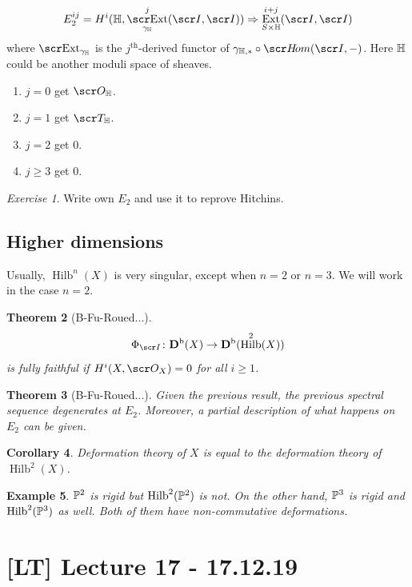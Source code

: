 \documentclass[A4paper, british]{amsart}
\theoremstyle{darkgreentheorem}
\newtheorem{thm}{Theorem}[section]
\newtheorem{cor}[thm]{Corollary}
\theoremstyle{darkbluedefinition}
\theoremstyle{darkredexample}
\newtheorem{exa}[thm]{Example}
\theoremstyle{remark}
\newtheorem{exe}[thm]{Exercise}
\DeclareMathOperator{\Ext}{Ext}
\DeclareMathOperator{\ext}{\E xt}
\DeclareMathOperator{\Hilb}{Hilb}
\newcommand{\1}{\mathbbm{1}}
\begin{document}
\[ E_{2}^{ij}=H^{i}(\bbH,\ext_{\gamma_{\bbH}}^{j}(\I,\I))\Rightarrow \Ext_{S\times \bbH}^{i+j}(\I,\I) \]
where $\ext_{\gamma_{\bbH}}$ is the $j^{\mathrm{th}}$-derived functor of $\gamma_{\bbH,*}\circ \hom(\I,-)$.
Here $\bbH$ could be another moduli space of sheaves.
\begin{enumerate}
    \item $j=0$ get $\O_{\bbH}$.
    \item $j=1$ get $\sT_{\bbH}$.
    \item $j=2$ get $0$.
    \item $j\geqslant 3$ get $0$.
\end{enumerate}

\begin{exe}
    Write own $E_{2}$ and use it to reprove Hitchins.
\end{exe}

\subsection{Higher dimensions}

Usually, $\Hilb^{n}(X)$ is very singular, except when $n=2$ or $n=3$.
We will work in the case $n=2$.

\begin{thm}[B-Fu-Roued...]
    \[ \Phi_{\I}\colon \Db(X)\to \Db(\Hilb^{2}(X)) \]
    is fully faithful if $H^{i}(X,\O_{X})=0$ for all $i\geqslant 1$.
\end{thm}

\begin{thm}[B-Fu-Roued...]
    Given the previous result, the previous spectral sequence degenerates at $E_{2}$.
    Moreover, a partial description of what happens on $E_{2}$ can be given.
\end{thm}

\begin{cor}
    Deformation theory of $X$ is equal to the deformation theory of $\Hilb^{2}(X)$.
\end{cor}

\begin{exa}
    $\P^{2}$ is rigid but $\Hilb^{2}(\P^{2})$ is not.
    On the other hand, $\P^{3}$ is rigid and $\Hilb^{2}(\P^{3})$ as well.
    Both of them have non-commutative deformations.
\end{exa}

\section{[LT] Lecture 17 - 17.12.19}
\end{document}
